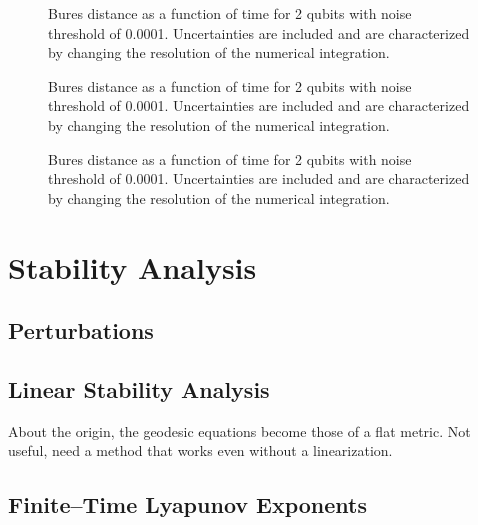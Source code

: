 \begin{figure}
\begin{center}
\end{center}
\caption{Bures distance as a function of time for 2 qubits with noise
threshold of 0.0001.  Uncertainties are included and are characterized 
by changing the resolution of the numerical integration.}
\end{figure}

\begin{figure}
\begin{center}
\end{center}
\caption{Bures distance as a function of time for 2 qubits with noise
threshold of 0.0001.  Uncertainties are included and are characterized 
by changing the resolution of the numerical integration.}
\end{figure}

\begin{figure}
\begin{center}
\end{center}
\caption{Bures distance as a function of time for 2 qubits with noise
threshold of 0.0001.  Uncertainties are included and are characterized 
by changing the resolution of the numerical integration.}
\end{figure}


\section{Stability Analysis}

\subsection{Perturbations}

\subsection{Linear Stability Analysis}

About the origin, the geodesic equations become those of a flat metric.
Not useful, need a method that works even without a linearization.


\subsection{Finite--Time Lyapunov Exponents}

